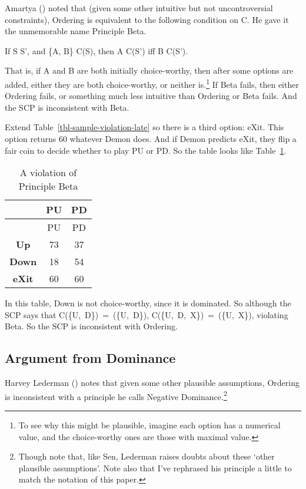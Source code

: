 \documentclass[
  10pt,
  letterpaper,
  DIV=11,
  numbers=noendperiod,
  twoside]{scrartcl}
\providecommand{\tightlist}{%
  \setlength{\itemsep}{0pt}\setlength{\parskip}{0pt}}\usepackage{longtable,booktabs,array}
\begin{document}
Amartya () noted that (given
some other intuitive but not uncontroversial constraints), Ordering is
equivalent to the following condition on C. He gave it the unmemorable
name Principle Beta.

\begin{description}
\tightlist
\item[Beta]
If S \subseteq S', and \{A, B\} \subseteq C(S), then A \in C(S') iff B
\in C(S').
\end{description}

That is, if A and B are both initially choice-worthy, then after some
options are added, either they are both choice-worthy, or neither
is.\footnote{To see why this might be plausible, imagine each option has
  a numerical value, and the choice-worthy ones are those with maximal
  value.} If Beta fails, then either Ordering fails, or something much
less intuitive than Ordering or Beta fails. And the SCP is inconsistent
with Beta.

Extend Table~\ref{tbl-sample-violation-late} so there is a third option:
eXit. This option returns 60 whatever Demon does. And if Demon predicts
eXit, they flip a fair coin to decide whether to play PU or PD. So the
table looks like Table~\ref{tbl-beta-violation}.

\begin{longtable}[]{@{}ccc@{}}
\caption{A violation of Principle
Beta}\label{tbl-beta-violation}\tabularnewline
\toprule\noalign{}
& PU & PD \\
\midrule\noalign{}
\endfirsthead
\toprule\noalign{}
& PU & PD \\
\midrule\noalign{}
\endhead
\bottomrule\noalign{}
\endlastfoot
\textbf{Up} & 73 & 37 \\
\textbf{Down} & 18 & 54 \\
\textbf{eXit} & 60 & 60 \\
\end{longtable}

In this table, Down is not choice-worthy, since it is dominated. So
although the SCP says that C(\{U,~D\})~=~(\{U,~D\}),
C(\{U,~D,~X\})~=~(\{U,~X\}), violating Beta. So the SCP is inconsistent
with Ordering.

\subsection{Argument from Dominance}\label{sec-neg-dom}

Harvey Lederman () notes that given some
other plausible assumptions, Ordering is inconsistent with a principle
he calls Negative Dominance.\footnote{Though note that, like Sen,
  Lederman raises doubts about these `other plausible assumptions'. Note
  also that I've rephrased his principle a little to match the notation
  of this paper.}
\end{document}
